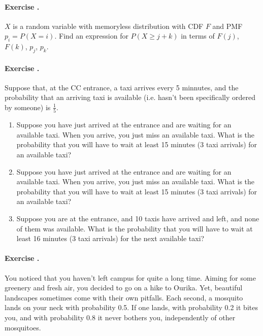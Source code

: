 \documentclass[twocolumn,12pt,a4paper]{article}
\newcounter{num}  %
\begin{document}
	\paragraph{Exercise \thenum.}
	$X$ is a random variable with memoryless distribution with CDF $F$ and PMF $p_i = P(X = i)$.
	Find an expression for $P(X \geq j + k)$ in terms of $F(j)$, $F(k)$, $p_j$, $p_k$.
	
	

\paragraph{Exercise \thenum.}
Suppose that, at the CC entrance, a taxi arrives every 5 minnutes, and the	probability that an arriving taxi is available (i.e. hasn't been specifically ordered by someone) is \( \frac{1}{5} \).
	
	\begin{enumerate}
		\item Suppose you have just arrived at the entrance and are waiting for an available taxi. When you arrive, you just miss an available taxi. 
		What is the probability that you will have to wait at least 15 minutes (3 taxi arrivals) for an available taxi?
		
		\item Suppose you have just arrived at the entrance and are waiting for an available taxi. When you arrive, you just miss an available taxi. 
		What is the probability that you will have to wait at least 15 minutes (3 taxi arrivals) for an available taxi?
		
		\item Suppose you are at the entrance, and 10 taxis have arrived and left, and none of them was available. What is the probability that you will have to wait at least 16 minutes (3 taxi arrivals) for the next available taxi?
	\end{enumerate}
	
	
	\paragraph{Exercise \thenum.}
You noticed that you haven't left campus for quite a long time.
Aiming for some greenery and fresh air, you decided to go on a hike to Ourika. 
Yet, beautiful landscapes sometimes come with their own pitfalls.
Each second, a mosquito lands on your neck with probability 0.5. If one lands, with probability 0.2 it bites you, and with probability 0.8 it never bothers you, independently of other mosquitoes.
\end{document}
